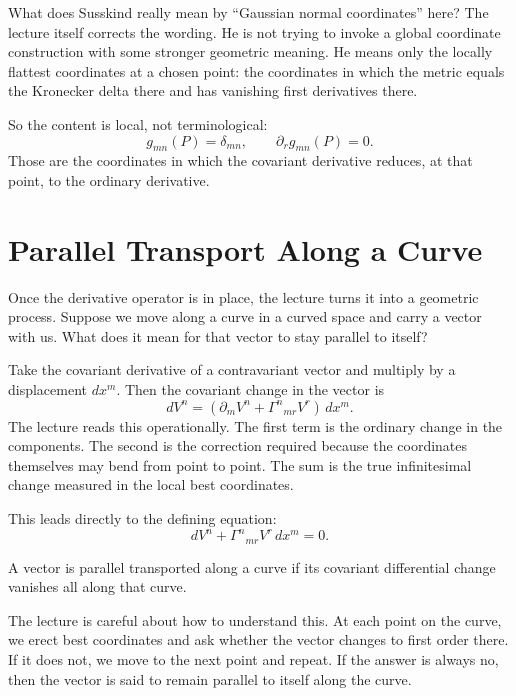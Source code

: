 What does Susskind really mean by ``Gaussian normal coordinates'' here? The lecture itself corrects the wording. He is not trying to invoke a global coordinate construction with some stronger geometric meaning. He means only the locally flattest coordinates at a chosen point: the coordinates in which the metric equals the Kronecker delta there and has vanishing first derivatives there.

So the content is local, not terminological:
\begin{equation}
g_{mn}(P)=\delta_{mn},
\qquad
\partial_r g_{mn}(P)=0.
\end{equation}
Those are the coordinates in which the covariant derivative reduces, at that point, to the ordinary derivative.

\section{Parallel Transport Along a Curve}

Once the derivative operator is in place, the lecture turns it into a geometric process. Suppose we move along a curve in a curved space and carry a vector with us. What does it mean for that vector to stay parallel to itself?

Take the covariant derivative of a contravariant vector and multiply by a displacement \(dx^m\). Then the covariant change in the vector is
\begin{equation}
dV^n
=
\left(
\partial_m V^n+\Gamma^{n}{}_{mr}V^r
\right)\,dx^m.
\end{equation}
The lecture reads this operationally. The first term is the ordinary change in the components. The second is the correction required because the coordinates themselves may bend from point to point. The sum is the true infinitesimal change measured in the local best coordinates.

This leads directly to the defining equation:
\begin{equation}
dV^n+\Gamma^{n}{}_{mr}V^r\,dx^m=0.
\end{equation}

\begin{definition}
A vector is parallel transported along a curve if its covariant differential change vanishes all along that curve.
\end{definition}

The lecture is careful about how to understand this. At each point on the curve, we erect best coordinates and ask whether the vector changes to first order there. If it does not, we move to the next point and repeat. If the answer is always no, then the vector is said to remain parallel to itself along the curve.

